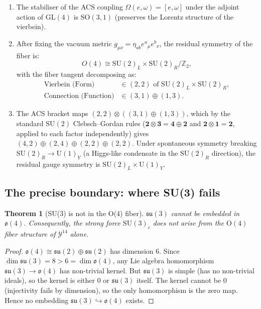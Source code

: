\documentclass[12pt,a4paper]{article}
\theoremstyle{plain}
\newtheorem{theorem}{Theorem}[section]
\theoremstyle{definition}
\theoremstyle{remark}
\begin{document}
\begin{enumerate}[label=(\arabic*)]
  \item The stabiliser of the ACS coupling $\Omega(e,\omega) = [e,\omega]$ 
    under the adjoint action of $\mathrm{GL}(4)$ is $\mathrm{SO}(3,1)$ 
    (preserves the Lorentz structure of the vierbein).

  \item After fixing the vacuum metric $g_{\mu\nu} = \eta_{ab}e^a{}_\mu e^b{}_\nu$,
    the residual symmetry of the fiber is:
    \begin{equation}
      O(4) \cong \mathrm{SU}(2)_L \times \mathrm{SU}(2)_R / \mathbb{Z}_2,
    \end{equation}
    with the fiber tangent decomposing as:
    \begin{align}
      \text{Vierbein (Form)} &\in (2,2) \text{ of } \mathrm{SU}(2)_L \times \mathrm{SU}(2)_R,\\
      \text{Connection (Function)} &\in (3,1) \oplus (1,3).
    \end{align}

  \item The ACS bracket maps
    $(2,2) \otimes ((3,1)\oplus(1,3))$, which by the standard $\mathrm{SU}(2)$
    Clebsch--Gordan rules ($\mathbf{2}\otimes\mathbf{3} = \mathbf{4}\oplus\mathbf{2}$
    and $\mathbf{2}\otimes\mathbf{1} = \mathbf{2}$, applied to each factor independently)
    gives $(4,2)\oplus(2,4)\oplus(2,2)\oplus(2,2)$.
    Under spontaneous symmetry breaking $\mathrm{SU}(2)_R \to \mathrm{U}(1)_Y$
    (a Higgs-like condensate in the $\mathrm{SU}(2)_R$ direction), the 
    residual gauge symmetry is $\mathrm{SU}(2)_L \times \mathrm{U}(1)_Y$.
\end{enumerate}

\subsection{The precise boundary: where SU(3) fails}

\begin{theorem}[SU(3) is not in the O(4) fiber]\label{thm:no-su3}\label{thm:su3-gap}
$\mathfrak{su}(3)$ cannot be embedded in $\mathfrak{o}(4)$.  
Consequently, the strong force $\mathrm{SU}(3)_c$ does not arise from 
the $\mathrm{O}(4)$ fiber structure of $\mathcal{Y}^{14}$ alone.
\end{theorem}

\begin{proof}
$\mathfrak{o}(4) \cong \mathfrak{su}(2) \oplus \mathfrak{su}(2)$ has dimension 6.
Since $\dim\mathfrak{su}(3) = 8 > 6 = \dim\mathfrak{o}(4)$, any Lie algebra 
homomorphism $\mathfrak{su}(3) \to \mathfrak{o}(4)$ has non-trivial kernel.
But $\mathfrak{su}(3)$ is simple (has no non-trivial ideals), so the kernel 
is either $0$ or $\mathfrak{su}(3)$ itself.  The kernel cannot be $0$ 
(injectivity fails by dimension), so the only homomorphism is the zero map.
Hence no embedding $\mathfrak{su}(3) \hookrightarrow \mathfrak{o}(4)$ exists.
\end{proof}
\end{document}
